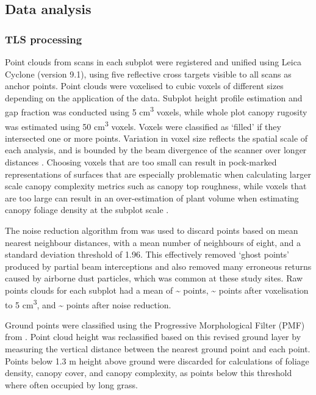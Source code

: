 \documentclass[11pt,a4paper]{article}
\begin{document}
\subsection{Data analysis}

\subsubsection{TLS processing}

Point clouds from scans in each subplot were registered and unified using Leica Cyclone (version 9.1), using five reflective cross targets visible to all scans as anchor points. Point clouds were voxelised to cubic voxels of different sizes depending on the application of the data. Subplot height profile estimation and gap fraction was conducted using 5 cm\textsuperscript{3} voxels, while whole plot canopy rugosity was estimated using 50 cm\textsuperscript{3} voxels. Voxels were classified as `filled' if they intersected one or more points. Variation in voxel size reflects the spatial scale of each analysis, and is bounded by the beam divergence of the scanner over longer distances \citep{Cifuentes2014}. Choosing voxels that are too small can result in pock-marked representations of surfaces that are especially problematic when calculating larger scale canopy complexity metrics such as canopy top roughness, while voxels that are too large can result in an over-estimation of plant volume when estimating canopy foliage density at the subplot scale \citep{Seidel2012, Cifuentes2014}. 

The noise reduction algorithm from \citet{Rusu2008} was used to discard points based on mean nearest neighbour distances, with a mean number of neighbours of eight, and a standard deviation threshold of 1.96. This effectively removed `ghost points' produced by partial beam interceptions and also removed many erroneous returns caused by airborne dust particles, which was common at these study sites. Raw points clouds for each subplot had a mean of \textasciitilde{}\rawpt{} points, \textasciitilde{}\voxelpt{} points after voxelisation to 5 cm\textsuperscript{3}, and \textasciitilde{}\subpt{} points after noise reduction. 

Ground points were classified using the Progressive Morphological Filter (PMF) from \citet{Zhang2003}. Point cloud height was reclassified based on this revised ground layer by measuring the vertical distance between the nearest ground point and each point. Points below 1.3 m height above ground were discarded for calculations of foliage density, canopy cover, and canopy complexity, as points below this threshold where often occupied by long grass.
\end{document}
